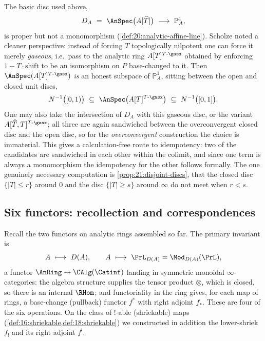 \begin{remark}
\label{rmk:21:disc-variants}
The basic disc used above,
\begin{equation*}
D_A\ =\ \AnSpec\bigl(A[\widehat T]\bigr)\ \longrightarrow\ \mathbb P^1_A ,
\end{equation*}
is proper but not a monomorphism (\cref{def:20:analytic-affine-line}). Scholze
noted a cleaner perspective: instead of forcing $T$ topologically nilpotent one
can force it merely \emph{gaseous}, i.e.\ pass to the analytic ring
$A[T]^{T\text{-}\gasx}$ obtained by enforcing $1-T\cdot\mathrm{shift}$ to be an
isomorphism on $P$ base-changed to it. Then $\AnSpec(A[T]^{T\text{-}\gasx})$
\emph{is} an honest subspace of $\mathbb P^1_A$, sitting between the open and
closed unit discs,
\begin{equation*}
N^{-1}\bigl([0,1)\bigr)\ \subseteq\ \AnSpec\bigl(A[T]^{T\text{-}\gasx}\bigr)\
\subseteq\ N^{-1}\bigl([0,1]\bigr).
\end{equation*}
One may also take the intersection of $D_A$ with this gaseous disc, or the
variant $A[\widehat T, T]^{T\text{-}\gasx}$; all three are again sandwiched
between the overconvergent closed disc and the open disc, so for the
\emph{overconvergent} construction the choice is immaterial. This gives a
calculation-free route to idempotency: two of the candidates are sandwiched in
each other within the colimit, and since one term is always a monomorphism the
idempotency for the other follows formally. The one genuinely necessary
computation is \cref{prop:21:disjoint-discs}, that the closed disc
$\{|T|\le r\}$ around $0$ and the disc $\{|T|\ge s\}$ around $\infty$ do not
meet when $r<s$.
\end{remark}

\subsection{Six functors: recollection and correspondences}
\label{subsec:21:six-functors}

Recall the two functors on analytic rings assembled so far. The primary
invariant is
\begin{equation*}
A\ \longmapsto\ D(A),\qquad A\ \longmapsto\ \PrL_{D(A)}=\Mod_{D(A)}(\PrL),
\end{equation*}
a functor $\AnRing\to\CAlg(\Catinf)$ landing in symmetric monoidal
$\infty$-categories: the algebra structure supplies the tensor product $\otimes$,
which is closed, so there is an internal $\RHom$; and functoriality in the ring
gives, for each map of rings, a base-change (pullback) functor $f^{*}$ with right
adjoint $f_{*}$. These are four of the six operations. On the class of
$!$-able (shriekable) maps (\cref{def:16:shriekable,def:18:shriekable}) we
constructed in addition the lower-shriek $f_{!}$ and its right adjoint $f^{!}$.

